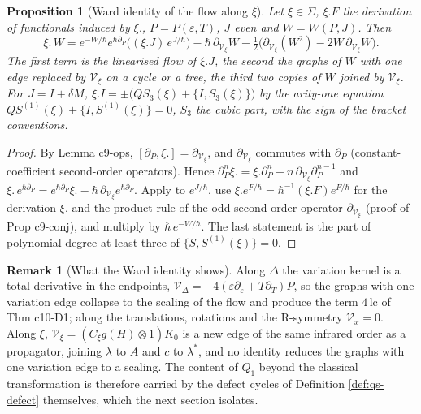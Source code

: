 \documentclass[11pt]{article}
\numberwithin{equation}{section}
\theoremstyle{plain}
\newtheorem{proposition}[theorem]{Proposition}
\theoremstyle{definition}
\newtheorem{remark}[theorem]{Remark}
\begin{document}
\begin{proposition}[Ward identity of the flow along $\xi$]
\label{prop:qs-ward}
Let $\xi\in\Sigma$, $\xi.F$ the derivation of functionals induced by $\xi.$, $P=P(\varepsilon,T)$, $J$ even and $W=W(P,J)$. Then
\begin{equation}
\xi.\,W=e^{-W/\hbar}e^{\hbar\partial_P}\big((\xi.J)\,e^{J/\hbar}\big)-\hbar\,\partial_{\mathcal V_\xi}W-\tfrac12\big(\partial_{\mathcal V_\xi}(W^2)-2W\,\partial_{\mathcal V_\xi}W\big).
\label{eq:qs-ward}
\end{equation}
The first term is the linearised flow of $\xi.J$, the second the graphs of $W$ with one edge replaced by $\mathcal V_\xi$ on a cycle or a tree, the third two copies of $W$ joined by $\mathcal V_\xi$. For $J=I+\delta M$, $\xi.I=\pm\big(QS_3(\xi)+\{I,S_3(\xi)\}\big)$ by the arity-one equation $QS^{(1)}(\xi)+\{I,S^{(1)}(\xi)\}=0$, $S_3$ the cubic part, with the sign of the bracket conventions.
\end{proposition}

\begin{proof}
By Lemma c9-ops, $[\partial_P,\xi.]=\partial_{\mathcal V_\xi}$, and $\partial_{\mathcal V_\xi}$ commutes with $\partial_P$ (constant-coefficient second-order operators). Hence $\partial_P^n\xi.=\xi.\partial_P^n+n\,\partial_{\mathcal V_\xi}\partial_P^{n-1}$ and $\xi.\,e^{\hbar\partial_P}=e^{\hbar\partial_P}\xi.-\hbar\,\partial_{\mathcal V_\xi}e^{\hbar\partial_P}$. Apply to $e^{J/\hbar}$, use $\xi.e^{F/\hbar}=\hbar^{-1}(\xi.F)e^{F/\hbar}$ for the derivation $\xi.$ and the product rule of the odd second-order operator $\partial_{\mathcal V_\xi}$ (proof of Prop c9-conj), and multiply by $\hbar\,e^{-W/\hbar}$. The last statement is the part of polynomial degree at least three of $\{S,S^{(1)}(\xi)\}=0$.
\end{proof}

\begin{remark}[What the Ward identity shows]
\label{rem:qs-ward}
Along $\Delta$ the variation kernel is a total derivative in the endpoints, $\mathcal V_\Delta=-4(\varepsilon\partial_\varepsilon+T\partial_T)P$, so the graphs with one variation edge collapse to the scaling of the flow and produce the term $4\,\mathrm{lc}$ of Thm c10-D1; along the translations, rotations and the R-symmetry $\mathcal V_x=0$. Along $\xi$, $\mathcal V_\xi=(C_\xi g(H)\otimes1)K_0$ is a new edge of the same infrared order as a propagator, joining $\lambda$ to $A$ and $c$ to $\lambda^*$, and no identity reduces the graphs with one variation edge to a scaling. The content of $Q_1$ beyond the classical transformation is therefore carried by the defect cycles of Definition \ref{def:qs-defect} themselves, which the next section isolates.
\end{remark}
\end{document}
